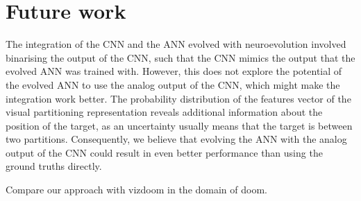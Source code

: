 \section{Future work}
\label{sec:futurework}
The integration of the CNN and the ANN evolved with neuroevolution involved binarising the output of the CNN, such that the CNN mimics the output that the evolved ANN was trained with. However, this does not explore the potential of the evolved ANN to use the analog output of the CNN, which might make the integration work better. The probability distribution of the features vector of the visual partitioning representation reveals additional information about the position of the target, as an uncertainty usually means that the target is between two partitions. Consequently, we believe that evolving the ANN with the analog output of the CNN could result in even better performance than using the ground truths directly.

Compare our approach with vizdoom in the domain of doom.